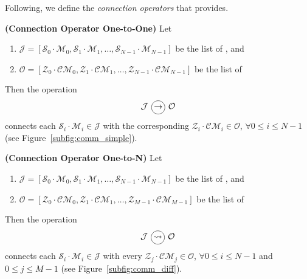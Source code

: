 
Following, we define the \textit{connection operators} that \posl{} provides.

\begin{definition}\label{op_conn:1to1}
{\bf (Connection Operator One-to-One)} Let 
\begin{enumerate}
\item $\mathcal{J} = \left[\mathcal{S}_0\cdot \mathcal{M}_0, \mathcal{S}_1\cdot \mathcal{M}_1,\dots, \mathcal{S}_{N-1}\cdot \mathcal{M}_{N-1}\right]$ be the list of \jacks, and
\item $\mathcal{O} = \left[\mathcal{Z}_0\cdot \mathcal{CM}_0, \mathcal{Z}_1\cdot \mathcal{CM}_1,\dots, \mathcal{Z}_{N-1}\cdot \mathcal{CM}_{N-1}\right]$ be the list of \outlets{}
\end{enumerate} Then the operation 
\[
\mathcal{J} \poslop{\rightarrow} \mathcal{O}
\]
connects each \jack{} $\mathcal{S}_i\cdot \mathcal{M}_i \in \mathcal{J}$ with the corresponding \outlet{} $\mathcal{Z}_i\cdot \mathcal{CM}_i \in \mathcal{O}$, $\forall 0 \leq i \leq N-1$ (see Figure~\ref{subfig:comm_simple}).
\end{definition}

\begin{definition}\label{op_conn:1ton}
{\bf (Connection Operator One-to-N)} Let 
\begin{enumerate} 
\item $\mathcal{J} = \left[\mathcal{S}_0\cdot \mathcal{M}_0, \mathcal{S}_1\cdot \mathcal{M}_1,\dots, \mathcal{S}_{N-1}\cdot \mathcal{M}_{N-1}\right]$ be the list of \jacks, and 
\item $\mathcal{O} = \left[\mathcal{Z}_0\cdot \mathcal{CM}_0, \mathcal{Z}_1\cdot \mathcal{CM}_1,\dots, \mathcal{Z}_{M-1}\cdot \mathcal{CM}_{M-1}\right]$ be the list of \outlets{} 
\end{enumerate} Then the operation 
\[
\mathcal{J} \poslop{\rightsquigarrow} \mathcal{O}
\]
connects each \jack{} $\mathcal{S}_i\cdot \mathcal{M}_i \in \mathcal{J}$ with every \outlet{} $\mathcal{Z}_j\cdot \mathcal{CM}_j \in \mathcal{O}$, $\forall 0 \leq i \leq N-1$ and $0 \leq j \leq M-1$ (see Figure~\ref{subfig:comm_diff}).
\end{definition}

